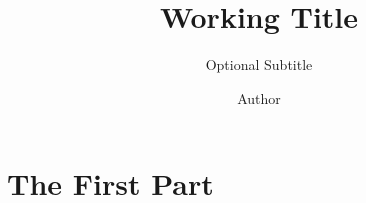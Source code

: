 \documentclass[colophon, english]{phduio}
\author{Author}
\title{Working Title}
\subtitle{Optional Subtitle}
\affiliation
{
    Optional Second Affiliation
    \and
    Optional Further Specification
}
\begin{document}
    \frontmatter        %

    \uiotitle

    
    
    

    \cleartorecto
    \tableofcontents    %
    \cleartorecto
    \listoffigures      %
    \cleartorecto
    \listoftables       %

    \mainmatter         %

    

    \part{The First Part}

    
    
    

    \appendix           %
    \appendixpage       %

    
    

    \backmatter         %

    \printbibliography
\end{document}

